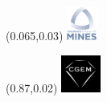 \documentclass[dark]{cgem-presentation}
\begin{document}
  \begin{frame}[plain]
    \begin{figure}
      \begin{textblock*}{1cm}(0.065\paperwidth,0.03\paperheight)
        \includegraphics[width=1cm]{mines-2018}
      \end{textblock*}
    \end{figure}
    \begin{figure}
      \begin{textblock*}{1cm}(0.87\paperwidth,0.02\paperheight)
        \includegraphics[width=1.3cm]{cgem-logo}
      \end{textblock*}
    \end{figure}
    \makequestion{-8mm}{-2mm}{1.75cm}{1.82cm}{1mm}
  \end{frame}

  \BibliographyFrame
  \VariableFrame
\end{document}
